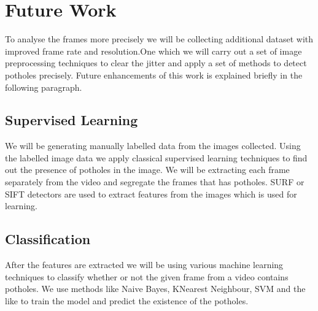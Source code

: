 \documentclass[12pt,a4paper]{article}
\begin{document}
\begin{itemize}
%
%    
\end{itemize}

\section{Future Work}

To analyse the frames more precisely we will be collecting additional dataset with improved frame rate and resolution.One which we will carry out a set of image preprocessing techniques to clear the jitter and apply a set of methods to detect potholes precisely. Future enhancements of this work is explained briefly in the following paragraph.


\subsection{Supervised Learning}
We will be generating manually labelled data from the images collected. Using the labelled image data we apply classical supervised learning techniques to find out the presence of potholes in the image. We will be extracting each frame separately from the video and segregate the frames that has potholes. SURF or SIFT detectors are used to extract features from the images which is used for learning. 

\subsection{Classification}
After the features are extracted we will be using various machine learning techniques to classify whether or not the given frame from a video contains potholes. We use methods like Naive Bayes, KNearest Neighbour, SVM and the like to train the model and predict the existence of the potholes.
\end{document}
